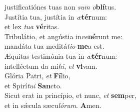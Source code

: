 \oddverse justificatiónes tuas non \textit{sum} \textit{o}\textbf{blí}tus.\\
\evenverse Justítia tua, justítia in \textit{æ}\textbf{tér}num:~\*\\
\evenverse et lex \textit{tu}\textit{a} \textbf{vé}ritas.\\
\oddverse Tribulátio, et angústia in\textit{ve}\textbf{né}runt me:~\*\\
\oddverse mandáta tua meditá\textit{ti}\textit{o} \textbf{me}a est.\\
\evenverse Æquitas testimónia tua in \textit{æ}\textbf{tér}num:~\*\\
\evenverse intelléctum da mi\textit{hi}, \textit{et} \textbf{vi}vam.\\
\oddverse Glória Patri, \textit{et} \textbf{Fí}lio,~\*\\
\oddverse et Spirí\textit{tu}\textit{i} \textbf{San}cto.\\
\evenverse Sicut erat in princípio, et nunc, \textit{et} \textbf{sem}per,~\*\\
\evenverse et in sǽcula sæcu\textit{ló}\textit{rum}. \textbf{A}men.\\
